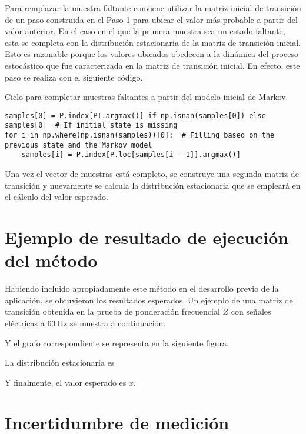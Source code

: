 Para remplazar la muestra faltante conviene utilizar la matriz inicial de transición de un paso construida en el \hyperref[sec:downsampling]{Paso 1} para ubicar el valor más probable a partir del valor anterior.
En el caso en el que la primera muestra sea un estado faltante, esta se completa con la distribución estacionaria de la matriz de transición inicial.
Esto es razonable porque los valores ubicados obedecen a la dinámica del proceso estocástico que fue caracterizada en la matriz de transición inicial.
En efecto, este paso se realiza con el siguiente código.
%
\begin{code}
    \caption{Ciclo para completar muestras faltantes a partir del modelo inicial de Markov.}
    \label{code:filling_missing_samples}
    \centering
    \begin{verbatim}
samples[0] = P.index[PI.argmax()] if np.isnan(samples[0]) else samples[0]  # If initial state is missing
for i in np.where(np.isnan(samples))[0]:  # Filling based on the previous state and the Markov model
    samples[i] = P.index[P.loc[samples[i - 1]].argmax()]
    \end{verbatim}
\end{code}

Una vez el vector de muestras está completo, se construye una segunda matriz de transición y nuevamente se calcula la distribución estacionaria que se empleará en el cálculo del valor esperado.


\section{Ejemplo de resultado de ejecución del método}
Habiendo incluido apropiadamente este método en el desarrollo previo de la aplicación, se obtuvieron los resultados esperados.
Un ejemplo de una matriz de transición obtenida en la prueba de ponderación frecuencial $Z$ con señales eléctricas a $\qty{63}{\Hz}$ se muestra a continuación.


Y el grafo correspondiente se representa en la siguiente figura.


La distribución estacionaria es


Y finalmente, el valor esperado es $x$.


\section{Incertidumbre de medición}

